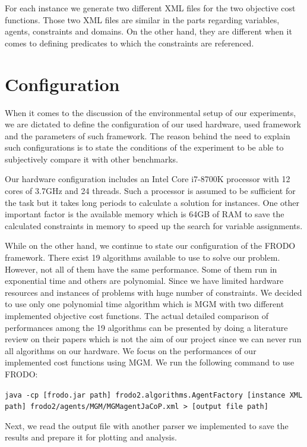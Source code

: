 \documentclass{article}
\begin{document}
	For each instance we generate two different XML files for the two objective cost functions. Those two XML files are similar in the parts regarding variables, agents, constraints and domains. On the other hand, they are different when it comes to defining predicates to which the constraints are referenced.
	
	\section{Configuration}
	When it comes to the discussion of the environmental setup of our experiments, we are dictated to define the configuration of our used hardware, used framework and the parameters of such framework. The reason behind the need to explain such configurations is to state the conditions of the experiment to be able to subjectively compare it with other benchmarks.
	
	Our hardware configuration includes an Intel Core i7-8700K processor with 12 cores of 3.7GHz and 24 threads. Such a processor is assumed to be sufficient for the task but it takes long periods to calculate a solution for instances. One other important factor is the available memory which is 64GB of RAM to save the calculated constraints in memory to speed up the search for variable assignments.
	
	While on the other hand, we continue to state our configuration of the FRODO framework. There exist 19 algorithms available to use to solve our problem. However, not all of them have the same performance. Some of them run in exponential time and others are polynomial. Since we have limited hardware resources and instances of problems with huge number of constraints. We decided to use only one polynomial time algorithm which is MGM with two different implemented objective cost functions. The actual detailed comparison of performances among the 19 algorithms can be presented by doing a literature review on their papers which is not the aim of our project since we can never run all algorithms on our hardware. We focus on the performances of our implemented cost functions using MGM. We run the following command to use FRODO:
	
	\noindent\texttt{java -cp [frodo.jar path] frodo2.algorithms.AgentFactory [instance XML path] frodo2/agents/MGM/MGMagentJaCoP.xml > [output file path]}
	
	Next, we read the output file with another parser we implemented to save the results and prepare it for plotting and analysis.
	
\end{document}

